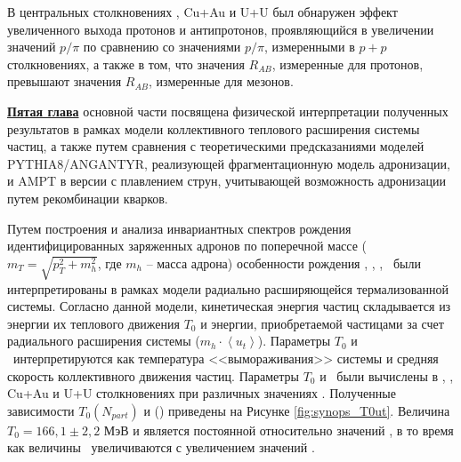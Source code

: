 \begin{comment}
\begin{figure}[] 
	\centerfloat
	\includegraphics [width=0.7\linewidth]{Results/DrawMesons_small.png}
	\caption{Значения факторов ядерной модификации ($R_{AB}$), измеренные для легких адронов(\pipm, \Kpm, \prots, $\pi^{0}$, $\phi$) в центральных и периферических столкновениях \pal \ и \heau.} 
	\label{img:synops_DrawMesonsSmall}
\end{figure}

\begin{figure}[] 
	\centerfloat
	\includegraphics [width=0.7\linewidth]{Results/DrawMesons_large.png}
	\caption{Значения факторов ядерной модификации ($R_{AB}$), измеренные для легких адронов(\pipm, \Kpm, \prots, $\pi^{0}$, $\phi$) в центральных и периферических столкновениях Cu+Au и U+U.} 
	\label{img:synops_DrawMesonsLarge}
\end{figure}
\end{comment}

В центральных столкновениях \heau, Cu+Au и U+U был обнаружен эффект увеличенного выхода протонов и антипротонов, проявляющийся в увеличении значений $p/\pi$ по сравнению со значениями $p/\pi$, измеренными в $p+p$ столкновениях, а также в том, что значения $R_{AB}$, измеренные для протонов, превышают значения $R_{AB}$, измеренные для мезонов. 


\underline{\textbf{Пятая глава}} основной части посвящена физической интерпретации полученных результатов в рамках модели коллективного теплового расширения системы частиц, а также путем сравнения с теоретическими предсказаниями моделей PYTHIA8/ANGANTYR, реализующей фрагментационную модель адронизации, и AMPT в версии с плавлением струн, учитывающей возможность адронизации путем рекомбинации кварков.

Путем построения и анализа инвариантных спектров рождения идентифицированных заряженных адронов по поперечной массе ($m_T = \sqrt{p_T^2 +m_h^2}$, где $m_h$ -- масса адрона) особенности рождения \pipm, \Kpm, \prot, \aprot \ были интерпретированы в рамках модели радиально расширяющейся термализованной системы. Согласно данной модели, кинетическая энергия частиц складывается из энергии их теплового движения $T_0$ и энергии, приобретаемой частицами за счет радиального расширения системы ($m_h \cdot \left< u_t\right>$). Параметры $T_0$ и \ut \  интерпретируются как температура <<вымораживания>> системы и средняя скорость коллективного движения частиц. Параметры $T_{0}$ и \ut \ были вычислены в \pal, \heau, Cu+Au и U+U столкновениях при различных значениях \Npart. 
Полученные зависимости $T_{0}(N_{part})$ и \ut(\Npart) приведены на Рисунке \ref{fig:synops_T0ut}. Величина $T_{0} = 166,1 \pm 2,2$ МэВ и является постоянной относительно значений \Npart, в то время как величины \ut \ увеличиваются с увеличением значений \Npart.

